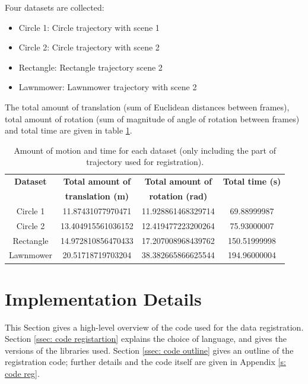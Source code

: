 \documentclass[12pt,a4paper]{article}
\begin{document}
    \newpage\noindent 
    Four datasets are collected:
    \begin{itemize}
      \item Circle 1: Circle trajectory with scene 1
      \item Circle 2: Circle trajectory with scene 2
      \item Rectangle: Rectangle trajectory scene 2
      \item Lawnmower: Lawnmower trajectory with scene 2
    \end{itemize}
    The total amount of translation (sum of Euclidean distances between frames), total amount of rotation (sum of magnitude of angle of rotation between frames) and total time are given in table \ref{t: res dataset characteristics}.

    \begin{table}[t!]
      \centering{}
      \begin{tabular}{|c|c|c|c|}
      \hline
      \textbf{Dataset} & \textbf{Total amount of} & \textbf{Total amount of} & \textbf{Total time (s)} \\ 
      {} & \textbf{translation (m)} & \textbf{rotation (rad)} & {} \\
      \hline
      Circle 1 & 11.87431077970471 & 11.928861468329714 & 69.88999987 \\
      \hline
      Circle 2 & 13.404915561036152 & 12.419477223200264 & 75.93000007 \\
      \hline
      Rectangle & 14.972810856470433 & 17.207008968439762 & 150.51999998 \\
      \hline
      Lawnmower & 20.51718719703204 & 38.382665866625544 & 194.96000004 \\
      \hline
      \end{tabular}
      \caption{Amount of motion and time for each dataset (only including the part of trajectory used for registration).}
      \label{t: res dataset characteristics}
    \end{table}  

\section{Implementation Details}

  This Section gives a high-level overview of the code used for the data registration. Section \ref{ssec: code registartion} explains the choice of language, and gives the versions of the libraries used. Section \ref{ssec: code outline} gives an outline of the registration code; further details and the code itself are given in Appendix \ref{s: code reg}.
\end{document}
